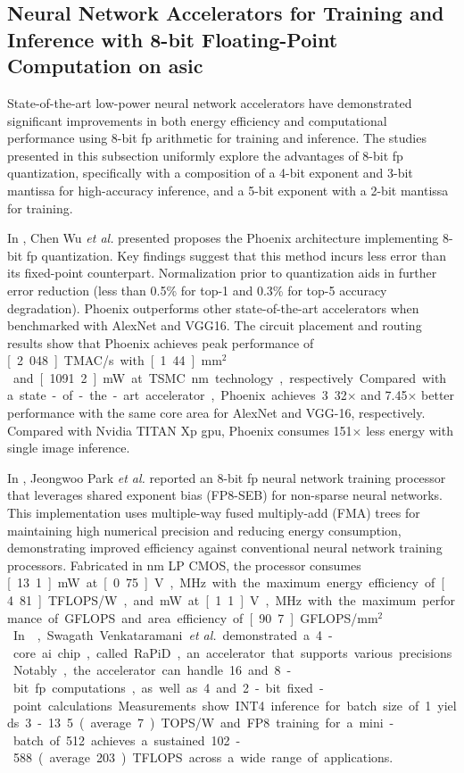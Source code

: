\subsection{Neural Network Accelerators for Training and Inference with 8-bit Floating-Point Computation on \gls{asic}
}
State-of-the-art low-power neural network accelerators have demonstrated significant improvements in both energy efficiency and computational performance using 8-bit \gls{fp} arithmetic for training and inference. The studies presented in this subsection uniformly explore the advantages of 8-bit \gls{fp} quantization, specifically with a composition of a 4-bit exponent and 3-bit mantissa for high-accuracy inference, and a 5-bit exponent with a 2-bit mantissa for training.

In \cite{wu2020phoenix}, Chen Wu \textit{et al.} presented proposes the Phoenix architecture implementing 8-bit \gls{fp} quantization. Key findings suggest that this method incurs less error than its fixed-point counterpart. Normalization prior to quantization aids in further error reduction (less than 0.5\% for top-1 and 0.3\%
for top-5 accuracy degradation). Phoenix outperforms other state-of-the-art accelerators when benchmarked with AlexNet and VGG16. The circuit placement and routing results show that Phoenix achieves peak performance of \unit[2.048]{TMAC/s} with \unit[1.44]{mm$^2$} and \unit[1091.2]{mW} at TSMC \unit[28]{nm} technology, respectively. Compared with a state-of-the-art accelerator, Phoenix achieves 3.32$\times$ and 7.45$\times$ better performance with
the same core area for AlexNet and VGG-16, respectively.
Compared with Nvidia TITAN Xp \gls{gpu}, Phoenix consumes
151$\times$ less energy with single image inference.

In \cite{park2021neural}, Jeongwoo Park \textit{et al.} reported an 8-bit \gls{fp} neural network training processor that leverages shared exponent bias (FP8-SEB) for non-sparse neural networks. This implementation uses multiple-way fused multiply-add (FMA) trees for maintaining high numerical precision and reducing energy consumption, demonstrating improved efficiency against conventional neural network training processors. Fabricated in \unit[40]{nm} LP CMOS, the processor consumes
\unit[13.1]{mW} at \unit[0.75]{V}, \unit[20]{MHz} with the maximum energy efficiency of \unit[4.81]{TFLOPS/W}, and \unit[230]{mW} at \unit[1.1]{V}, \unit[180]{MHz} with the maximum performance of \unit[567]{GFLOPS} and area efficiency of \unit[90.7]{GFLOPS/mm$^2$}.

In \cite{venkataramani2021rapid}, Swagath Venkataramani \textit{et al.} demonstrated a 4-core \gls{ai} chip, called RaPiD, an accelerator that supports various precisions. Notably, the accelerator can handle 16 and 8-bit \gls{fp} computations, as well as 4 and 2-bit fixed-point calculations. Measurements show INT4 inference for batch size of 1 yields 3 - 13.5 (average 7) TOPS/W and FP8 training for a mini-batch of 512 achieves a sustained 102 - 588 (average 203) TFLOPS across a wide range of applications.

